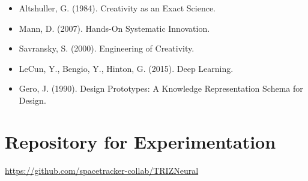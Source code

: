\documentclass[12pt]{article}
\begin{document}
\begin{itemize}
\item Altshuller, G. (1984). Creativity as an Exact Science.
\item Mann, D. (2007). Hands-On Systematic Innovation.
\item Savransky, S. (2000). Engineering of Creativity.
\item LeCun, Y., Bengio, Y., Hinton, G. (2015). Deep Learning.
\item Gero, J. (1990). Design Prototypes: A Knowledge Representation Schema for Design.
\end{itemize}

\section{Repository for Experimentation}

\noindent
\url{https://github.com/spacetracker-collab/TRIZNeural}
\end{document}
